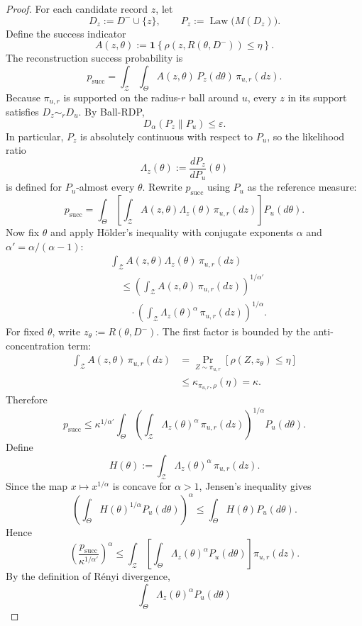 \documentclass[11pt,a4paper]{report}
\theoremstyle{plain}
\theoremstyle{definition}
\theoremstyle{remark}
\DeclareMathOperator{\Law}{Law}
\newcommand{\ind}[1]{\mathbf{1}\!\left\{#1\right\}}
\begin{document}
\begin{proof}
For each candidate record $z$, let
\[
D_z:=D^-\cup\{z\},
\qquad
P_z:=\Law\big(M(D_z)\big).
\]
Define the success indicator
\[
A(z,\theta):=\ind{\rho(z,R(\theta,D^-))\le \eta}.
\]
The reconstruction success probability is
\[
p_{\mathrm{succ}}
=
\int_{\mathcal{Z}}\int_{\Theta} A(z,\theta)\,P_z(d\theta)\,\pi_{u,r}(dz).
\]
Because $\pi_{u,r}$ is supported on the radius-$r$ ball around $u$, every $z$ in its support satisfies $D_z\sim_r D_u$. By Ball-RDP,
\[
D_\alpha(P_z\|P_u)\le \varepsilon.
\]
In particular, $P_z$ is absolutely continuous with respect to $P_u$, so the likelihood ratio
\[
\Lambda_z(\theta):=\frac{dP_z}{dP_u}(\theta)
\]
is defined for $P_u$-almost every $\theta$. Rewrite $p_{\mathrm{succ}}$ using $P_u$ as the reference measure:
\[
p_{\mathrm{succ}}
=
\int_{\Theta}
\left[
\int_{\mathcal{Z}} A(z,\theta)\Lambda_z(\theta)\,\pi_{u,r}(dz)
\right]
P_u(d\theta).
\]
Now fix $\theta$ and apply Hölder's inequality with conjugate exponents
$\alpha$ and $\alpha'=\alpha/(\alpha-1)$:
\[
\begin{aligned}
&\int_{\mathcal{Z}}
A(z,\theta)\Lambda_z(\theta)\,\pi_{u,r}(dz) \\
&\quad\le
\left(
\int_{\mathcal{Z}}
A(z,\theta)\,\pi_{u,r}(dz)
\right)^{1/\alpha'} \\
&\qquad\cdot
\left(
\int_{\mathcal{Z}}
\Lambda_z(\theta)^\alpha\,\pi_{u,r}(dz)
\right)^{1/\alpha}.
\end{aligned}
\]
For fixed $\theta$, write $z_\theta:=R(\theta,D^-)$. The first factor is
bounded by the anti-concentration term:
\[
\begin{aligned}
\int_{\mathcal{Z}} A(z,\theta)\,\pi_{u,r}(dz)
&=
\Pr_{Z\sim\pi_{u,r}}
[\rho(Z,z_\theta)\le \eta] \\
&\le
\kappa_{\pi_{u,r},\rho}(\eta)
=
\kappa.
\end{aligned}
\]
Therefore
\[
p_{\mathrm{succ}}
\le
\kappa^{1/\alpha'}
\int_{\Theta}
\left(\int_{\mathcal{Z}} \Lambda_z(\theta)^\alpha\,\pi_{u,r}(dz)\right)^{1/\alpha}
P_u(d\theta).
\]
Define
\[
H(\theta):=\int_{\mathcal{Z}} \Lambda_z(\theta)^\alpha\,\pi_{u,r}(dz).
\]
Since the map $x\mapsto x^{1/\alpha}$ is concave for $\alpha>1$, Jensen's inequality gives
\[
\left(
\int_{\Theta} H(\theta)^{1/\alpha}P_u(d\theta)
\right)^\alpha
\le
\int_{\Theta} H(\theta)P_u(d\theta).
\]
Hence
\[
\left(\frac{p_{\mathrm{succ}}}{\kappa^{1/\alpha'}}\right)^\alpha
\le
\int_{\mathcal{Z}}
\left[
\int_{\Theta} \Lambda_z(\theta)^\alpha P_u(d\theta)
\right]
\pi_{u,r}(dz).
\]
By the definition of Rényi divergence,
\[
\int_{\Theta} \Lambda_z(\theta)^\alpha P_u(d\theta)
\]
\end{proof}
\end{document}
